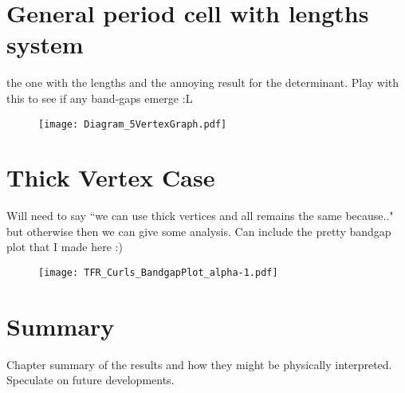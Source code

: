\section{General period cell with lengths system}
the one with the lengths and the annoying result for the determinant.
Play with this to see if any band-gaps emerge :L
\begin{figure}[h]
	\centering
	\texttt{[image: Diagram\_5VertexGraph.pdf]}
	\caption{\label{fig:Diagram_5VertexGraph}}
\end{figure}

\section{Thick Vertex Case}
Will need to say ``we can use thick vertices and all remains the same because.." but otherwise then we can give some analysis.
Can include the pretty bandgap plot that I made here :)
\begin{figure}[h]
	\centering
	\texttt{[image: TFR\_Curls\_BandgapPlot\_alpha-1.pdf]}
	\caption{\label{fig:TFR_Curls_BandgapPlot_alpha-1}}
\end{figure}

\section{Summary}
Chapter summary of the results and how they might be physically interpreted.
Speculate on future developments.
